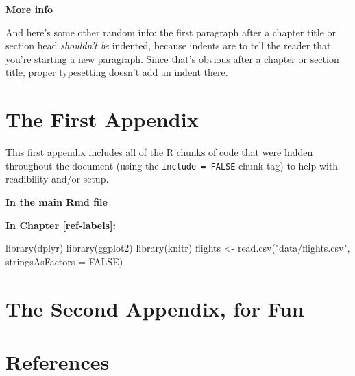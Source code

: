 \documentclass[12pt,oneside]{tisemthesis}
\newenvironment{Shaded}{\begin{snugshade}}{\end{snugshade}}
\newcommand{\AttributeTok}[1]{\textcolor[rgb]{0.77,0.63,0.00}{#1}}
\newcommand{\ConstantTok}[1]{\textcolor[rgb]{0.00,0.00,0.00}{#1}}
\newcommand{\FunctionTok}[1]{\textcolor[rgb]{0.00,0.00,0.00}{#1}}
\newcommand{\NormalTok}[1]{#1}
\newcommand{\OtherTok}[1]{\textcolor[rgb]{0.56,0.35,0.01}{#1}}
\newcommand{\StringTok}[1]{\textcolor[rgb]{0.31,0.60,0.02}{#1}}
\begin{document}
\textbf{More info}

And here's some other random info: the first paragraph after a chapter title or section head \emph{shouldn't be} indented, because indents are to tell the reader that you're starting a new paragraph.
Since that's obvious after a chapter or section title, proper typesetting doesn't add an indent there.

\appendix

\hypertarget{the-first-appendix}{%
\chapter{The First Appendix}\label{the-first-appendix}}

This first appendix includes all of the R chunks of code that were hidden throughout the document (using the \texttt{include\ =\ FALSE} chunk tag) to help with readibility and/or setup.

\textbf{In the main Rmd file}

\textbf{In Chapter \ref{ref-labels}:}
\begin{Shaded}
\begin{Highlighting}[]
\FunctionTok{library}\NormalTok{(dplyr)}
\FunctionTok{library}\NormalTok{(ggplot2)}
\FunctionTok{library}\NormalTok{(knitr)}
\NormalTok{flights }\OtherTok{\textless{}{-}} \FunctionTok{read.csv}\NormalTok{(}\StringTok{"data/flights.csv"}\NormalTok{, }\AttributeTok{stringsAsFactors =} \ConstantTok{FALSE}\NormalTok{)}
\end{Highlighting}
\end{Shaded}
\hypertarget{the-second-appendix-for-fun}{%
\chapter{The Second Appendix, for Fun}\label{the-second-appendix-for-fun}}

\backmatter

\hypertarget{references}{%
\chapter*{References}\label{references}}


\noindent

\setlength{\parindent}{-0.20in}
\end{document}
